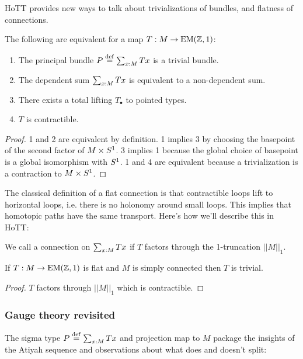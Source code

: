 HoTT provides new ways to talk about trivializations of bundles, and flatness of connections.

\begin{mythm}\label{thm:triv}
The following are equivalent for a map \( T:M\to\mathrm{EM}(\mathbb{Z},1) \):
\begin{enumerate}
\item The principal bundle \( P\stackrel{\mathrm{def}}{=}\sum_{x:M}Tx \) is a trivial bundle.
\item The dependent sum \( \sum_{x:M}Tx \) is equivalent to a non-dependent sum.
\item There exists a total lifting \( T_\bullet \) to pointed types.
\item \( T \) is contractible.
\end{enumerate}
\end{mythm}

\begin{proof}
1 and 2 are equivalent by definition. 1 implies 3 by choosing the basepoint of the second factor of \( M\times S^1 \). 3 implies 1 because the global choice of basepoint is a global isomorphism with \( S^1 \). 1 and 4 are equivalent because a trivialization is a contraction to \( M\times S^1 \).
\end{proof}

The classical definition of a flat connection is that contractible loops lift to horizontal loops, i.e. there is no holonomy around small loops. This implies that homotopic paths have the same transport. Here's how we'll describe this in HoTT:
\begin{mydef}
We call a connection on \( \sum_{x:M}Tx \)  if \( T \) factors through the 1-truncation \( ||M||_1 \).
\end{mydef}

\begin{mylemma}
If \( T:M\to\mathrm{EM}(\mathbb{Z},1) \) is flat and \( M \) is simply connected then \( T \) is trivial.
\end{mylemma}
\begin{proof}
\( T \) factors through \( ||M||_1 \) which is contractible.
\end{proof}

\subsubsection{Gauge theory revisited}

The sigma type \( P\stackrel{\mathrm{def}}{=}\sum_{x:M}Tx \) and projection map to \( M \) package the insights of the Atiyah sequence and observations about what does and doesn't split:


